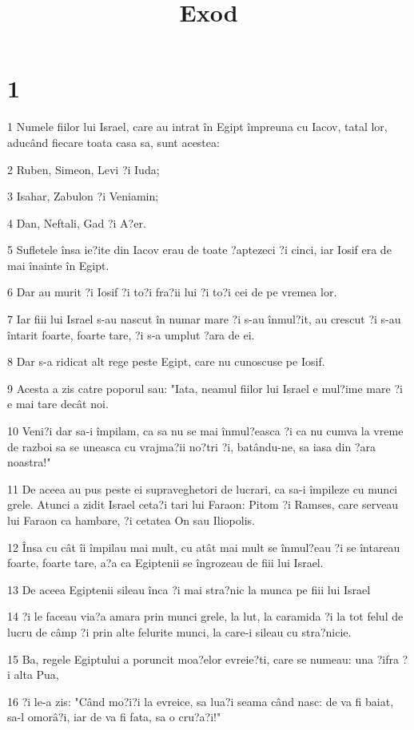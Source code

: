 

\title{Exod}


\chapter{1}

\par 1 Numele fiilor lui Israel, care au intrat în Egipt împreuna cu Iacov, tatal lor, aducând fiecare toata casa sa, sunt acestea:
\par 2 Ruben, Simeon, Levi ?i Iuda;
\par 3 Isahar, Zabulon ?i Veniamin;
\par 4 Dan, Neftali, Gad ?i A?er.
\par 5 Sufletele însa ie?ite din Iacov erau de toate ?aptezeci ?i cinci, iar Iosif era de mai înainte în Egipt.
\par 6 Dar au murit ?i Iosif ?i to?i fra?ii lui ?i to?i cei de pe vremea lor.
\par 7 Iar fiii lui Israel s-au nascut în numar mare ?i s-au înmul?it, au crescut ?i s-au întarit foarte, foarte tare, ?i s-a umplut ?ara de ei.
\par 8 Dar s-a ridicat alt rege peste Egipt, care nu cunoscuse pe Iosif.
\par 9 Acesta a zis catre poporul sau: "Iata, neamul fiilor lui Israel e mul?ime mare ?i e mai tare decât noi.
\par 10 Veni?i dar sa-i împilam, ca sa nu se mai înmul?easca ?i ca nu cumva la vreme de razboi sa se uneasca cu vrajma?ii no?tri ?i, batându-ne, sa iasa din ?ara noastra!"
\par 11 De aceea au pus peste ei supraveghetori de lucrari, ca sa-i împileze cu munci grele. Atunci a zidit Israel ceta?i tari lui Faraon: Pitom ?i Ramses, care serveau lui Faraon ca hambare, ?i cetatea On sau Iliopolis.
\par 12 Însa cu cât îi împilau mai mult, cu atât mai mult se înmul?eau ?i se întareau foarte, foarte tare, a?a ca Egiptenii se îngrozeau de fiii lui Israel.
\par 13 De aceea Egiptenii sileau înca ?i mai stra?nic la munca pe fiii lui Israel
\par 14 ?i le faceau via?a amara prin munci grele, la lut, la caramida ?i la tot felul de lucru de câmp ?i prin alte felurite munci, la care-i sileau cu stra?nicie.
\par 15 Ba, regele Egiptului a poruncit moa?elor evreie?ti, care se numeau: una ?ifra ?i alta Pua,
\par 16 ?i le-a zis: "Când mo?i?i la evreice, sa lua?i seama când nasc: de va fi baiat, sa-l omorâ?i, iar de va fi fata, sa o cru?a?i!"
